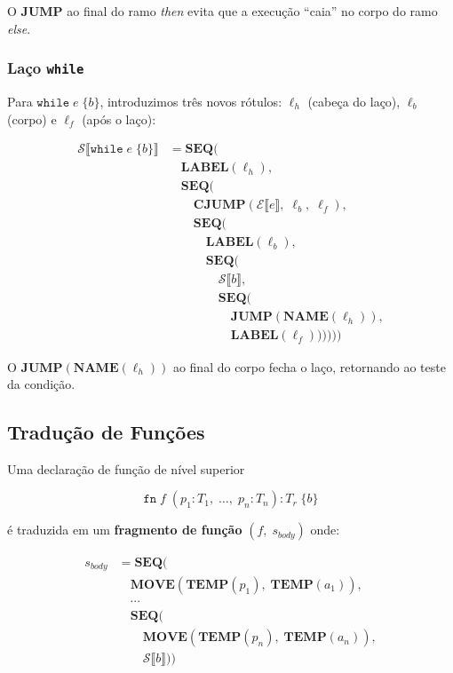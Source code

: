O $\mathbf{JUMP}$ ao final do ramo \emph{then} evita que a execução
``caia'' no corpo do ramo \emph{else}.

\subsubsection*{Laço \texttt{while}}

Para $\mathtt{while}\; e\; \{b\}$, introduzimos três novos rótulos:
$\ell_h$ (cabeça do laço), $\ell_b$ (corpo) e $\ell_f$ (após o laço):

\[
  \begin{aligned}
    \mathcal{S}\llbracket \mathtt{while}\; e\; \{b\} \rrbracket
    &= \mathbf{SEQ}( \\
      &\quad \mathbf{LABEL}(\ell_h), \\
      &\quad \mathbf{SEQ}( \\
        &\qquad \mathbf{CJUMP}(\mathcal{E}\llbracket e \rrbracket,\;
        \ell_b,\; \ell_f), \\
        &\qquad \mathbf{SEQ}( \\
          &\qquad\quad \mathbf{LABEL}(\ell_b), \\
          &\qquad\quad \mathbf{SEQ}( \\
            &\qquad\qquad \mathcal{S}\llbracket b \rrbracket, \\
            &\qquad\qquad \mathbf{SEQ}( \\
              &\qquad\qquad\quad \mathbf{JUMP}(\mathbf{NAME}(\ell_h)), \\
    &\qquad\qquad\quad \mathbf{LABEL}(\ell_f))))))
  \end{aligned}
\]

O $\mathbf{JUMP}(\mathbf{NAME}(\ell_h))$ ao final do corpo fecha o laço,
retornando ao teste da condição.

\subsection{Tradução de Funções}\label{sec:sdt-fn}

Uma declaração de função de nível superior

\[
  \mathtt{fn}\; f\;
  (p_1 : T_1,\; \ldots,\; p_n : T_n) : T_r\; \{b\}
\]

é traduzida em um \textbf{fragmento de função} $(f,\; s_{\mathit{body}})$
onde:

\[
  \begin{aligned}
    s_{\mathit{body}}
    &= \mathbf{SEQ}( \\
      &\quad \mathbf{MOVE}(\mathbf{TEMP}(p_1),\; \mathbf{TEMP}(a_1)), \\
      &\quad \cdots \\
      &\quad \mathbf{SEQ}( \\
        &\qquad \mathbf{MOVE}(\mathbf{TEMP}(p_n),\; \mathbf{TEMP}(a_n)), \\
    &\qquad \mathcal{S}\llbracket b \rrbracket))
  \end{aligned}
\]


